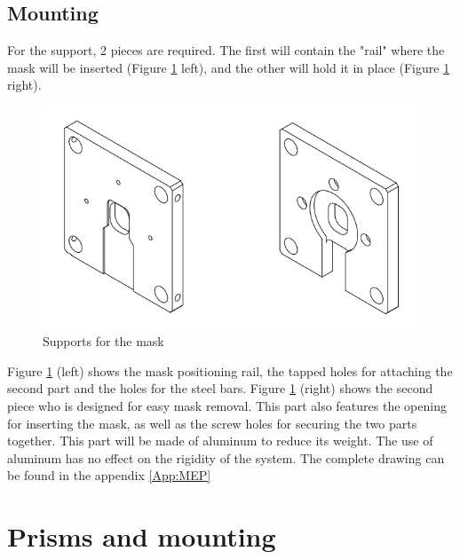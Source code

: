 \subsection{Mounting}
For the support, 2 pieces are required. The first will contain the "rail" where the mask will be inserted (Figure \ref{fig:Mec_Mask_Sup_Rail} left),
 and the other will hold it in place (Figure \ref{fig:Mec_Mask_Sup_Rail} right).
\begin{figure}[H]
    \centering
    \includegraphics[scale=0.85]{assets/figures/Mechanical Design/Support_masque_rail.png}
    \caption{Supports for the mask}
    \label{fig:Mec_Mask_Sup_Rail}
\end{figure}
Figure \ref{fig:Mec_Mask_Sup_Rail} (left) shows the mask positioning rail, the tapped holes for attaching the second part and the holes 
for the steel bars. \newline
Figure \ref{fig:Mec_Mask_Sup_Rail} (right) shows the second piece who is designed for easy mask removal. This part also features the opening 
for inserting the mask, as well as the screw holes for securing the two parts together.\bigbreak
This part will be made of aluminum to reduce its weight. The use of aluminum has no effect on the rigidity of the system.
\bigbreak
The complete drawing can be found in the appendix \ref{App:MEP}
\section{Prisms and mounting}\label{sec:prisms}
